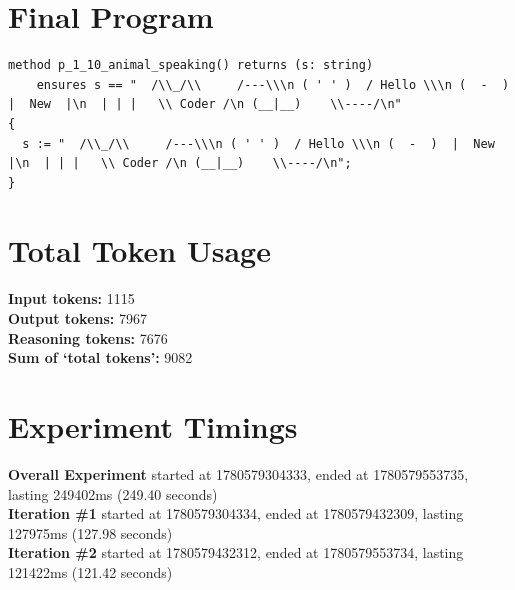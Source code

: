 \documentclass{article}
\begin{document}
\section*{Final Program}
\begin{lstlisting}
method p_1_10_animal_speaking() returns (s: string)
	ensures s == "  /\\_/\\     /---\\\n ( ' ' )  / Hello \\\n (  -  )  |  New  |\n  | | |   \\ Coder /\n (__|__)    \\----/\n"
{
  s := "  /\\_/\\     /---\\\n ( ' ' )  / Hello \\\n (  -  )  |  New  |\n  | | |   \\ Coder /\n (__|__)    \\----/\n";
}
\end{lstlisting}
\section*{Total Token Usage}
\textbf{Input tokens: }1115
\\\textbf{Output tokens: }7967
\\\textbf{Reasoning tokens: }7676
\\\textbf{Sum of `total tokens': }9082
\section*{Experiment Timings}
\textbf{Overall Experiment} started at 1780579304333, ended at 1780579553735, lasting 249402ms (249.40 seconds)
\\\textbf{Iteration \#1} started at 1780579304334, ended at 1780579432309, lasting 127975ms (127.98 seconds)
\\\textbf{Iteration \#2} started at 1780579432312, ended at 1780579553734, lasting 121422ms (121.42 seconds)
\end{document}
